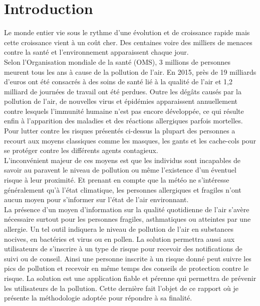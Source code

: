 \chapter*{Introduction}
\vspace*{1cm}
\qquad Le monde entier vie sous le rythme d'une évolution et de croissance rapide mais cette croissance vient à un coût cher. Des centaines voire des milliers de menaces contre la santé et l'environnement apparaissent chaque jour.\\

Selon l’Organisation mondiale de la santé (OMS), 3 millions de personnes meurent tous les ans à cause de la pollution de l’air. En 2015, près de 19 milliards d’euros ont été consacrés à des soins de santé lié à la qualité de l’air et 1,2 milliard de journées de travail ont été perdues. Outre les dégâts causés par la pollution de l'air, de nouvelles virus et épidémies apparaissent annuellement contre lesquels l'immunité humaine n'est pas encore développée, ce qui résulte enfin à l'apparition des maladies et des réactions allergiques parfois mortelles.\cite{1}\\

Pour lutter contre les risques présentés ci-dessus la plupart des personnes a recourt aux moyens classiques comme les masques, les gants et les cache-cols pour se protéger contre les différents agents contagieux.\\

L'inconvénient majeur de ces moyens est que les individus sont incapables de savoir au paravent le niveau de pollution ou même l'existence d'un éventuel risque à leur proximité. Et prenant en compte que la météo ne s'intéresse généralement qu'à l'état climatique, les personnes allergiques et fragiles n'ont aucun moyen pour s'informer sur l'état de l'air environnant.\\

La présence d'un moyen d'information sur la qualité quotidienne de l'air s'avère nécessaire surtout pour les personnes fragiles, asthmatiques ou atteintes par une allergie. Un tel outil indiquera le niveau de pollution de l'air en substances nocives, en bactéries et virus ou en pollen. La solution permettra aussi aux utilisateurs de s'inscrire à un type de risque pour recevoir des notifications de suivi ou de conseil. Ainsi une personne inscrite à un risque donné peut suivre les pics de pollution et recevoir en même temps des conseils de protection contre le risque. La solution est une application fiable et pérenne qui permettra de prévenir les utilisateurs de la pollution. Cette dernière fait l’objet de ce rapport où je présente la méthodologie adoptée pour répondre à sa finalité.\\

